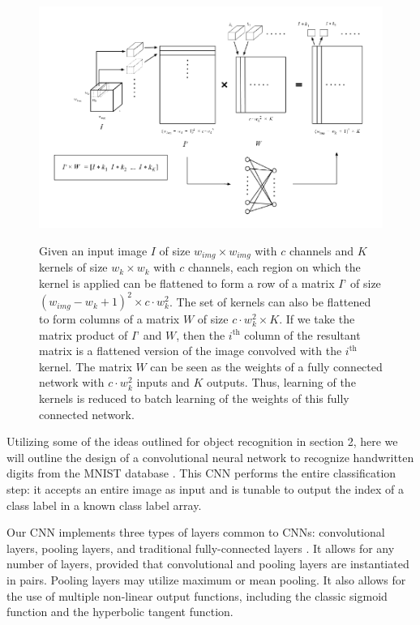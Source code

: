 \documentclass[10pt,twocolumn,letterpaper]{article}
\begin{document}
\begin{figure}
  \includegraphics[width=\textwidth,height=8cm]{convtrans}
  \caption{Given an input image $I$ of size $w_{img} \times w_{img}$ with $c$ channels and $K$ kernels of size
  $w_k \times w_k$ with $c$ channels, each region on which the kernel is applied can be flattened to form a
  row of a matrix $I’$ of size $(w_{img} - w_k + 1)^2 \times c \cdot w_k^2$. The set of kernels can also be
  flattened to form columns of a matrix $W$ of size $c \cdot w_k^2 \times K$. If we take the matrix product
  of $I’$ and $W$, then the $i^\text{th}$ column of the resultant matrix is a flattened version of the image
  convolved with the $i^\text{th}$ kernel. The matrix $W$ can be seen as the weights of a fully connected
  network with $c \cdot w_k^2$ inputs and $K$ outputs. Thus, learning of the kernels is reduced to batch
  learning of the weights of this fully connected network.
}
  \label{fig:convtrans}
\end{figure}

Utilizing some of the ideas outlined for object recognition in section 2,
here we will outline the design of a convolutional neural network to recognize
handwritten digits from the MNIST database \cite{MNIST}.
This CNN performs the entire classification step: it accepts an entire image as input
and is tunable to output the index of a class label in a known class label array.

Our CNN implements three types of layers common to CNNs: convolutional layers, pooling layers,
and traditional fully-connected layers \cite{ImageNet} \cite{Verydeep}.
It allows for any number of layers, provided that convolutional and pooling layers are
instantiated in pairs.
Pooling layers may utilize maximum or mean pooling.
It also allows for the use of multiple non-linear output functions,
including the classic sigmoid function and the hyperbolic tangent function.
\end{document}
